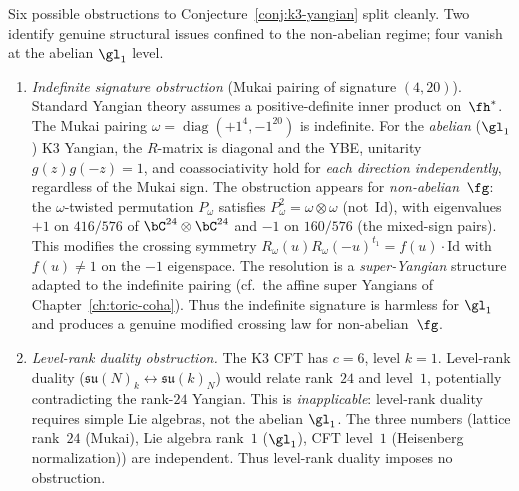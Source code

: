 
\begin{remark}
\label{rem:k3-yangian-obstructions}
Six possible obstructions to Conjecture~\ref{conj:k3-yangian} split
cleanly. Two identify genuine structural issues confined to the
non-abelian regime; four vanish at the abelian $\gl_1$ level.
\begin{enumerate}[label=\textbf{A\arabic*.}, leftmargin=2.5em]

\item \emph{Indefinite signature obstruction} (Mukai pairing of signature
$(4,20)$).
Standard Yangian theory assumes a positive-definite inner product
on~$\fh^*$. The Mukai pairing $\omega = \operatorname{diag}(+1^4, -1^{20})$
is indefinite. For the \emph{abelian} ($\gl_1$) K3 Yangian, the $R$-matrix
is diagonal and the YBE, unitarity $g(z)g(-z) = 1$, and coassociativity
hold for \emph{each direction independently}, regardless of the Mukai sign.
The obstruction appears for \emph{non-abelian}~$\fg$: the $\omega$-twisted
permutation $P_\omega$ satisfies $P_\omega^2 = \omega \otimes \omega$
(not~$\mathrm{Id}$), with eigenvalues $+1$ on $416/576$ of
$\bC^{24} \otimes \bC^{24}$ and $-1$ on $160/576$ (the mixed-sign
pairs). This modifies the crossing symmetry
$R_\omega(u) R_\omega(-u)^{t_1} = f(u) \cdot \mathrm{Id}$ with
$f(u) \neq 1$ on the $-1$ eigenspace.
The resolution is a \emph{super-Yangian} structure adapted to the
indefinite pairing (cf.\ the affine super Yangians
of Chapter~\ref{ch:toric-coha}).
Thus the indefinite signature is harmless for $\gl_1$ and produces a
genuine modified crossing law for non-abelian~$\fg$.

\item \emph{Level-rank duality obstruction.}
The K3 CFT has $c = 6$, level $k = 1$. Level-rank duality
($\mathfrak{su}(N)_k \leftrightarrow \mathfrak{su}(k)_N$) would
relate rank~$24$ and level~$1$, potentially contradicting the
rank-$24$ Yangian. This is \emph{inapplicable}: level-rank duality
requires simple Lie algebras, not the abelian $\gl_1$.
The three numbers (lattice rank~$24$ (Mukai), Lie algebra rank~$1$
($\gl_1$), CFT level~$1$ (Heisenberg normalization)) are independent.
Thus level-rank duality imposes no obstruction.


\end{enumerate}
\end{remark}
